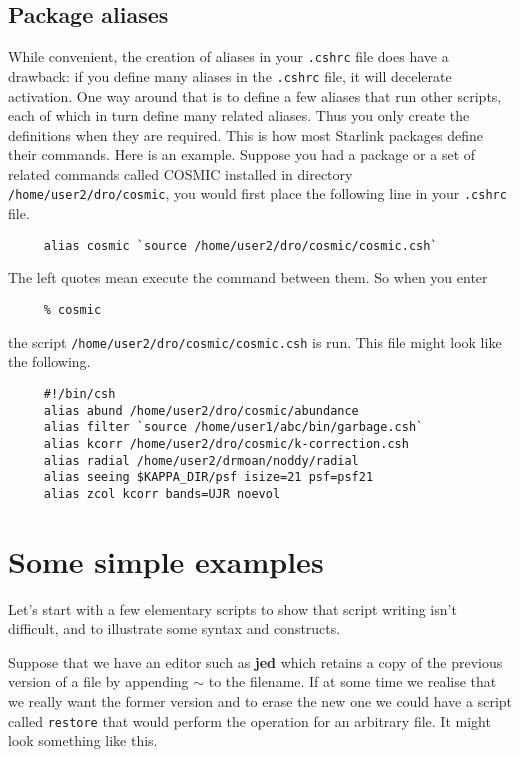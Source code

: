 \subsection{Package aliases\label{sc4_se_package}}

While convenient, the creation of aliases in your {\tt .cshrc} file
does have a drawback: if you define many aliases in the {\tt .cshrc}
file, it will decelerate  activation.
One way around that is to define a few aliases that run other scripts,
each of which in turn define many related aliases.  Thus you only
create the definitions when they are required.  This is how most
Starlink packages define their commands.  Here is an example.  Suppose
you had a package or a set of related commands called COSMIC installed
in directory {\tt /home/user2/dro/cosmic}, you would first place the
following line in your {\tt .cshrc} file.

\small
\begin{verbatim}
     alias cosmic `source /home/user2/dro/cosmic/cosmic.csh`
\end{verbatim}
\normalsize
The left quotes mean execute the command between them.  So when you
enter

\small
\begin{verbatim}
     % cosmic
\end{verbatim}
\normalsize
the script {\tt /home/user2/dro/cosmic/cosmic.csh} is run.  This file
might look like the following.

\small
\begin{verbatim}
     #!/bin/csh
     alias abund /home/user2/dro/cosmic/abundance
     alias filter `source /home/user1/abc/bin/garbage.csh`
     alias kcorr /home/user2/dro/cosmic/k-correction.csh
     alias radial /home/user2/drmoan/noddy/radial
     alias seeing $KAPPA_DIR/psf isize=21 psf=psf21
     alias zcol kcorr bands=UJR noevol
\end{verbatim}
\normalsize

\newpage
\section{Some simple examples\label{sc4_se_simple}}

Let's start with a few elementary scripts to show that script writing
isn't difficult, and to illustrate some syntax and constructs.

Suppose that we have an editor such as {\bf jed} which retains a copy
of the previous version of a file by appending {\tt $\sim$} to the
filename.  If at some time we realise that we really want the former
version and to erase the new one we could have a script called
{\tt restore} that would perform the operation for an arbitrary file.
It might look something like this.


